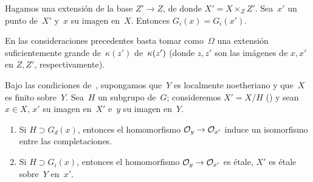 \begin{proposition}
\label{V.2.1}
Hagamos una extensión de la base $Z'\to Z$, de donde
$X'=X\times_ZZ'$. Sea~$x'$ un punto de~$X'$ y~$x$ su imagen en~$X$.
Entonces $G_i(x)=G_i(x')$.
\end{proposition}

En las consideraciones precedentes basta tomar como~$\Omega$ una extensión
suficientemente grande
{de~$\kappa(z')$}
{de~$\kres(z')$}
(donde $z,z'$ son las imágenes de $x,x'$ en $Z,Z'$, respectivamente).

\begin{proposition}
\label{V.2.2}
Bajo las condiciones de~, supongamos que~$Y$ es localmente
noetheriano y que~$X$ es finito sobre~$Y$. Sea~$H$ un subgrupo de~$G$;
consideremos $X'=X/H$ (\cf {}) y sean
$x\in X$, $x'$ su imagen en~$X'$ e~$y$ su imagen en~$Y$.
\begin{enumerate}
\item[(i)] Si $H\supset G_d(x)$, entonces el homomorfismo
$\cal{O}_y\to\cal{O}_{x'}$ induce un isomorfismo entre las completaciones.
\item[(ii)] Si $H\supset G_i(x)$, entonces el homomorfismo
$\cal{O}_y\to\cal{O}_{x'}$ es étale, \ie $X'$ es étale sobre~$Y$ en~$x'$.
\end{enumerate}
\end{proposition}

